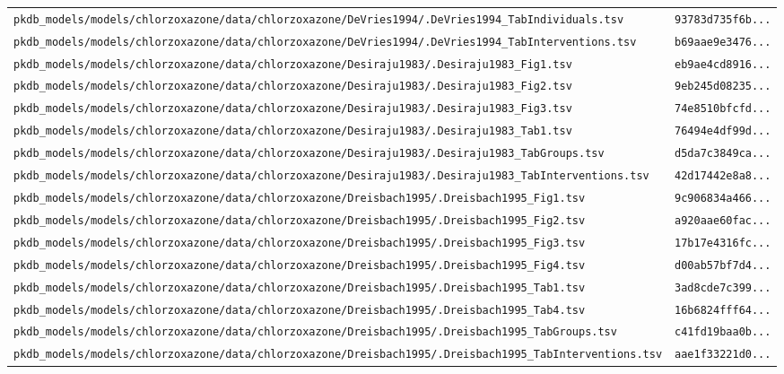 \documentclass{article}
\begin{document}
\begin{longtable}{ll}
\texttt{pkdb\_models/models/chlorzoxazone/data/chlorzoxazone/DeVries1994/.DeVries1994\_TabIndividuals.tsv} & \texttt{93783d735f6b...} \\
\texttt{pkdb\_models/models/chlorzoxazone/data/chlorzoxazone/DeVries1994/.DeVries1994\_TabInterventions.tsv} & \texttt{b69aae9e3476...} \\
\texttt{pkdb\_models/models/chlorzoxazone/data/chlorzoxazone/Desiraju1983/.Desiraju1983\_Fig1.tsv} & \texttt{eb9ae4cd8916...} \\
\texttt{pkdb\_models/models/chlorzoxazone/data/chlorzoxazone/Desiraju1983/.Desiraju1983\_Fig2.tsv} & \texttt{9eb245d08235...} \\
\texttt{pkdb\_models/models/chlorzoxazone/data/chlorzoxazone/Desiraju1983/.Desiraju1983\_Fig3.tsv} & \texttt{74e8510bfcfd...} \\
\texttt{pkdb\_models/models/chlorzoxazone/data/chlorzoxazone/Desiraju1983/.Desiraju1983\_Tab1.tsv} & \texttt{76494e4df99d...} \\
\texttt{pkdb\_models/models/chlorzoxazone/data/chlorzoxazone/Desiraju1983/.Desiraju1983\_TabGroups.tsv} & \texttt{d5da7c3849ca...} \\
\texttt{pkdb\_models/models/chlorzoxazone/data/chlorzoxazone/Desiraju1983/.Desiraju1983\_TabInterventions.tsv} & \texttt{42d17442e8a8...} \\
\texttt{pkdb\_models/models/chlorzoxazone/data/chlorzoxazone/Dreisbach1995/.Dreisbach1995\_Fig1.tsv} & \texttt{9c906834a466...} \\
\texttt{pkdb\_models/models/chlorzoxazone/data/chlorzoxazone/Dreisbach1995/.Dreisbach1995\_Fig2.tsv} & \texttt{a920aae60fac...} \\
\texttt{pkdb\_models/models/chlorzoxazone/data/chlorzoxazone/Dreisbach1995/.Dreisbach1995\_Fig3.tsv} & \texttt{17b17e4316fc...} \\
\texttt{pkdb\_models/models/chlorzoxazone/data/chlorzoxazone/Dreisbach1995/.Dreisbach1995\_Fig4.tsv} & \texttt{d00ab57bf7d4...} \\
\texttt{pkdb\_models/models/chlorzoxazone/data/chlorzoxazone/Dreisbach1995/.Dreisbach1995\_Tab1.tsv} & \texttt{3ad8cde7c399...} \\
\texttt{pkdb\_models/models/chlorzoxazone/data/chlorzoxazone/Dreisbach1995/.Dreisbach1995\_Tab4.tsv} & \texttt{16b6824fff64...} \\
\texttt{pkdb\_models/models/chlorzoxazone/data/chlorzoxazone/Dreisbach1995/.Dreisbach1995\_TabGroups.tsv} & \texttt{c41fd19baa0b...} \\
\texttt{pkdb\_models/models/chlorzoxazone/data/chlorzoxazone/Dreisbach1995/.Dreisbach1995\_TabInterventions.tsv} & \texttt{aae1f33221d0...} \\

\end{longtable}
\end{document}
